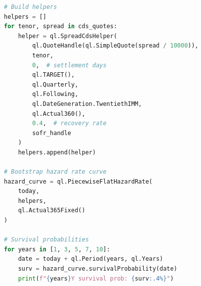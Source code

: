 \documentclass[conference]{IEEEtran}
\theoremstyle{definition}
\begin{document}
\begin{appendices}
\begin{lstlisting}[language=Python, caption=CDS Curve Bootstrap in QuantLib]
# Build helpers
helpers = []
for tenor, spread in cds_quotes:
    helper = ql.SpreadCdsHelper(
        ql.QuoteHandle(ql.SimpleQuote(spread / 10000)),
        tenor,
        0,  # settlement days
        ql.TARGET(),
        ql.Quarterly,
        ql.Following,
        ql.DateGeneration.TwentiethIMM,
        ql.Actual360(),
        0.4,  # recovery rate
        sofr_handle
    )
    helpers.append(helper)

# Bootstrap hazard rate curve
hazard_curve = ql.PiecewiseFlatHazardRate(
    today,
    helpers,
    ql.Actual365Fixed()
)

# Survival probabilities
for years in [1, 3, 5, 7, 10]:
    date = today + ql.Period(years, ql.Years)
    surv = hazard_curve.survivalProbability(date)
    print(f"{years}Y survival prob: {surv:.4%}")
\end{lstlisting}

\end{appendices}
\end{document}
